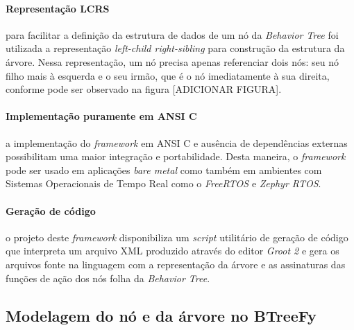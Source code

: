 \documentclass[conference]{IEEEtran}
\begin{document}

\paragraph{\textbf{Representação LCRS}} para facilitar a definição da estrutura de dados de um nó da \textit{Behavior Tree} foi utilizada a representação \textit{left-child right-sibling} para construção da estrutura da árvore. Nessa representação, um nó precisa apenas referenciar dois nós: seu nó filho mais à esquerda e o seu irmão, que é o nó imediatamente à sua direita, conforme pode ser observado na figura [ADICIONAR FIGURA].

\paragraph{\textbf{Implementação puramente em ANSI C}} a implementação do \textit{framework} em ANSI C e ausência de dependências externas possibilitam uma maior integração e portabilidade. Desta maneira, o \textit{framework} pode ser usado em aplicações \textit{bare metal} como também em ambientes com Sistemas Operacionais de Tempo Real como o \textit{FreeRTOS} e \textit{Zephyr RTOS}.

\paragraph{\textbf{Geração de código}} o projeto deste \textit{framework} disponibiliza um \textit{script} utilitário de geração de código que interpreta um arquivo XML produzido através do editor \textit{Groot 2} e gera os arquivos fonte na linguagem com a representação da árvore e as assinaturas das funções de ação dos nós folha da \textit{Behavior Tree}.


\subsection{Modelagem do nó e da árvore no BTreeFy}
\end{document}
